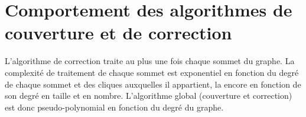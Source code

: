 %
%
% 
%
%
%
% 
%

\section{Comportement des algorithmes de couverture et de correction}
L'algorithme de correction traite au plus une fois chaque sommet du graphe.
La complexit\'e de traitement de chaque sommet est exponentiel en fonction du degr\'e de chaque sommet et des cliques auxquelles il appartient, la encore en fonction  de son degr\'e en taille et en nombre.
L'algorithme global (couverture et correction) est donc pseudo-polynomial en fonction du degr\'e du graphe.
\newline

